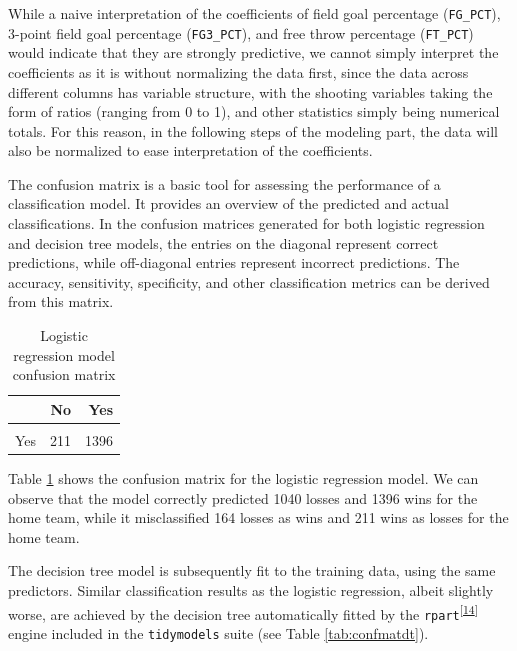 \documentclass[
  12pt,
  a4paper,
]{article}
\begin{document}
While a naive interpretation of the coefficients of field goal percentage (\texttt{FG\_PCT}), 3-point field goal percentage (\texttt{FG3\_PCT}), and free throw percentage (\texttt{FT\_PCT}) would indicate that they are strongly predictive, we cannot simply interpret the coefficients as it is without normalizing the data first, since the data across different columns has variable structure, with the shooting variables taking the form of ratios (ranging from 0 to 1), and other statistics simply being numerical totals. For this reason, in the following steps of the modeling part, the data will also be normalized to ease interpretation of the coefficients.

The confusion matrix is a basic tool for assessing the performance of a classification model. It provides an overview of the predicted and actual classifications. In the confusion matrices generated for both logistic regression and decision tree models, the entries on the diagonal represent correct predictions, while off-diagonal entries represent incorrect predictions. The accuracy, sensitivity, specificity, and other classification metrics can be derived from this matrix.

\begin{table}

\caption{\label{tab:confmatlr}Logistic regression model confusion matrix}
\centering
\begin{tabular}[t]{lrr}
\toprule
  & No & Yes\\
\midrule
\cellcolor{gray!30}{No} & \cellcolor{gray!30}{1040} & \cellcolor{gray!30}{164}\\
Yes & 211 & 1396\\
\bottomrule
\end{tabular}
\end{table}

Table \ref{tab:confmatlr} shows the confusion matrix for the logistic regression model. We can observe that the model correctly predicted 1040 losses and 1396 wins for the home team, while it misclassified 164 losses as wins and 211 wins as losses for the home team.

The decision tree model is subsequently fit to the training data, using the same predictors. Similar classification results as the logistic regression, albeit slightly worse, are achieved by the decision tree automatically fitted by the \texttt{rpart}\textsuperscript{{[}\protect\hyperlink{ref-rpart}{14}{]}} engine included in the \texttt{tidymodels} suite (see Table \ref{tab:confmatdt}).
\end{document}
